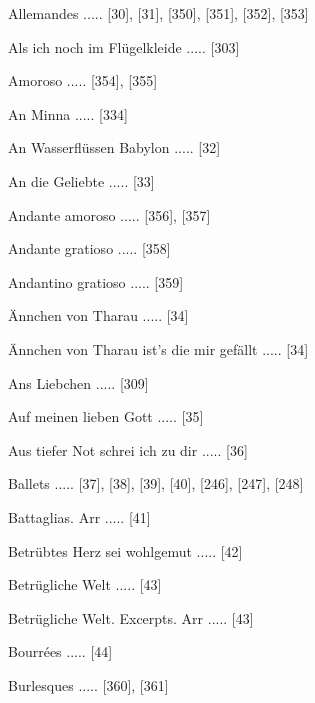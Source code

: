 \documentclass[twocolumn]{book}
\begin{document}
\newline 
Allemandes ..... [30], [31], [350], [351], [352], [353]

\newline 
Als ich noch im Flügelkleide ..... [303]

\newline 
Amoroso ..... [354], [355]

\newline 
An Minna ..... [334]

\newline 
An Wasserflüssen Babylon ..... [32]

\newline 
An die Geliebte ..... [33]

\newline 
Andante amoroso ..... [356], [357]

\newline 
Andante gratioso ..... [358]

\newline 
Andantino gratioso ..... [359]

\newline 
Ännchen von Tharau ..... [34]

\newline 
Ännchen von Tharau ist's die mir gefällt ..... [34]

\newline 
Ans Liebchen ..... [309]

\newline 
Auf meinen lieben Gott ..... [35]

\newline 
Aus tiefer Not schrei ich zu dir ..... [36]

\newline 
Ballets ..... [37], [38], [39], [40], [246], [247], [248]

\newline 
Battaglias. Arr ..... [41]

\newline 
Betrübtes Herz sei wohlgemut ..... [42]

\newline 
Betrügliche Welt ..... [43]

\newline 
Betrügliche Welt. Excerpts. Arr ..... [43]

\newline 
Bourrées ..... [44]

\newline 
Burlesques ..... [360], [361]
\end{document}
